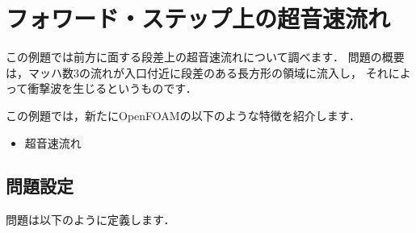 \section{フォワード・ステップ上の超音速流れ}
\label{sec:3.3}
この例題では前方に面する段差上の超音速流れについて調べます．
問題の概要は，マッハ数$3$の流れが入口付近に段差のある長方形の領域に流入し，
それによって衝撃波を生じるというものです．

この例題では，新たにOpenFOAMの以下のような特徴を紹介します．
\begin{itemize}
 \item 超音速流れ
\end{itemize}


\subsection{問題設定}
\label{ssec:3.3.1}
問題は以下のように定義します．
